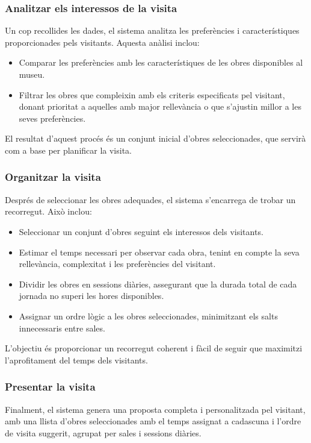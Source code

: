 \documentclass[a4paper]{article}
\begin{document}
	
	\subsubsection{Analitzar els interessos de la visita}
	
	Un cop recollides les dades, el sistema analitza les preferències i característiques proporcionades pels visitants. Aquesta anàlisi inclou:
	\begin{itemize}
		\item Comparar les preferències amb les característiques de les obres disponibles al museu.
		\item Filtrar les obres que compleixin amb els criteris especificats pel visitant, donant prioritat a aquelles amb major rellevància o que s’ajustin millor a les seves preferències.
	\end{itemize}
	
	El resultat d’aquest procés és un conjunt inicial d’obres seleccionades, que servirà com a base per planificar la visita.
	
	
	\subsubsection{Organitzar la visita}

	Després de seleccionar les obres adequades, el sistema s’encarrega de trobar un recorregut. Això inclou:
	\begin{itemize}
		\item Seleccionar un conjunt d'obres seguint els interessos dels visitants.
		\item Estimar el temps necessari per observar cada obra, tenint en compte la seva rellevància, complexitat i les preferències del visitant.
		\item Dividir les obres en sessions diàries, assegurant que la durada total de cada jornada no superi les hores disponibles.
		\item Assignar un ordre lògic a les obres seleccionades, minimitzant els salts innecessaris entre sales.
	\end{itemize}
	
	L’objectiu és proporcionar un recorregut coherent i fàcil de seguir que maximitzi l’aprofitament del temps dels visitants.
	
	\subsubsection{Presentar la visita}
	
	Finalment, el sistema genera una proposta completa i personalitzada pel visitant, amb una llista d'obres seleccionades amb el temps assignat a cadascuna i l’ordre de visita suggerit, agrupat per sales i sessions diàries.
\end{document}
